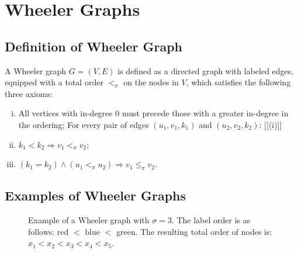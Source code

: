 \chapter{Wheeler Graphs}

\section{Definition of Wheeler Graph}

\begin{definition} \label{def_wheeler_graphs}
    A Wheeler graph $G=(V,E)$ is defined as a directed graph with labeled edges, equipped with a total order $<_{\pi}$ on the nodes in $V$, which satisfies the following three axioms:

    \begin{enumerate}[(i)]
        \item All vertices with in-degree $0$ must precede those with a greater in-degree in the ordering; \label{axiom_1}
    For every pair of edges $(u_1,v_1,k_1)$ and $(u_2,v_2,k_2)$:
    [{[(i)]}]
        \item $k_1<k_2 \Rightarrow v_1<_{\pi}v_2$; \label{axiom_2}
        \item $(k_1=k_2) \wedge (u_1<_{\pi}u_2) \Rightarrow v_1\leq_{\pi}v_2$. \label{axiom_3}
    \end{enumerate}
\end{definition}

\section{Examples of Wheeler Graphs}
\begin{figure}[H]
    \centering
    \caption[Example of a Wheeler Graph]{Example of a Wheeler graph with $\sigma=3$. The label order is as follows: red $<$ blue $<$ green. The resulting total order of nodes is: $x_1<x_2<x_3<x_4<x_5$. }
    \label{fig:wheeler_example}
\end{figure}

